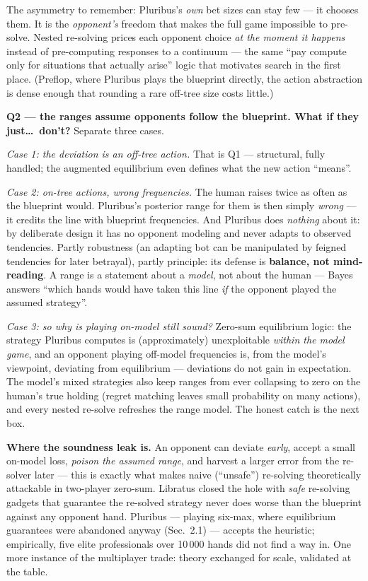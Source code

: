 \documentclass[11pt,a4paper]{article}
\begin{document}
\begin{intuition}
The asymmetry to remember: Pluribus's \emph{own} bet sizes can stay few ---
it chooses them. It is the \emph{opponent's} freedom that makes the full
game impossible to pre-solve. Nested re-solving prices each opponent choice
\emph{at the moment it happens} instead of pre-computing responses to a
continuum --- the same ``pay compute only for situations that actually
arise'' logic that motivates search in the first place. (Preflop, where
Pluribus plays the blueprint directly, the action abstraction is dense
enough that rounding a rare off-tree size costs little.)
\end{intuition}

\textbf{Q2 --- the ranges assume opponents follow the blueprint. What if
they just\dots\ don't?} Separate three cases.

\emph{Case 1: the deviation is an off-tree action.} That is Q1 ---
structural, fully handled; the augmented equilibrium even defines what the
new action ``means''.

\emph{Case 2: on-tree actions, wrong frequencies.} The human raises twice as
often as the blueprint would. Pluribus's posterior range for them is then
simply \emph{wrong} --- it credits the line with blueprint frequencies. And
Pluribus does \emph{nothing} about it: by deliberate design it has no
opponent modeling and never adapts to observed tendencies. Partly
robustness (an adapting bot can be manipulated by feigned tendencies for
later betrayal), partly principle: its defense is \textbf{balance, not
mind-reading}. A range is a statement about a \emph{model}, not about the
human --- Bayes answers ``which hands would have taken this line \emph{if}
the opponent played the assumed strategy''.

\emph{Case 3: so why is playing on-model still sound?} Zero-sum equilibrium
logic: the strategy Pluribus computes is (approximately) unexploitable
\emph{within the model game}, and an opponent playing off-model frequencies
is, from the model's viewpoint, deviating from equilibrium --- deviations do
not gain in expectation. The model's mixed strategies also keep ranges from
ever collapsing to zero on the human's true holding (regret matching leaves
small probability on many actions), and every nested re-solve refreshes the
range model. The honest catch is the next box.

\begin{trap}
\textbf{Where the soundness leak is.} An opponent can deviate \emph{early},
accept a small on-model loss, \emph{poison the assumed range}, and harvest a
larger error from the re-solver later --- this is exactly what makes naive
(``unsafe'') re-solving theoretically attackable in two-player zero-sum.
Libratus closed the hole with \emph{safe} re-solving gadgets that guarantee
the re-solved strategy never does worse than the blueprint against any
opponent hand. Pluribus --- playing six-max, where equilibrium guarantees
were abandoned anyway (Sec.\ 2.1) --- accepts the heuristic; empirically,
five elite professionals over 10\,000 hands did not find a way in. One more
instance of the multiplayer trade: theory exchanged for scale, validated at
the table.
\end{trap}
\end{document}
